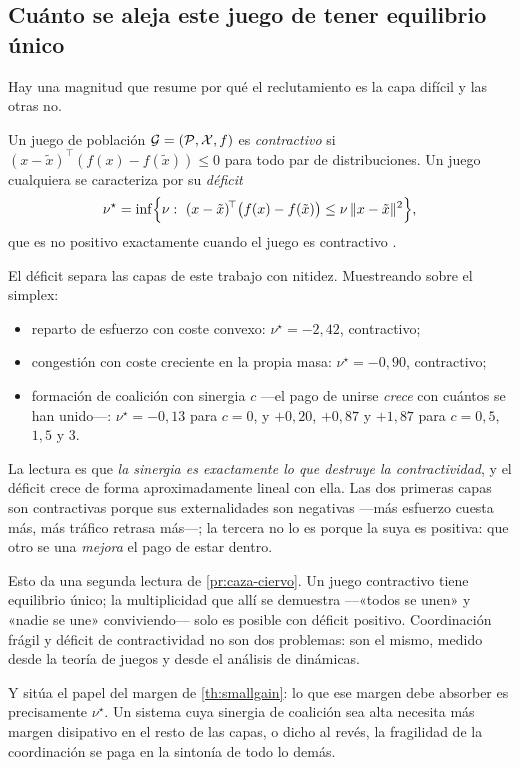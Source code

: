 \subsection{Cuánto se aleja este juego de tener equilibrio único}

Hay una magnitud que resume por qué el reclutamiento es la capa difícil y las
otras no.

\begin{definicion}
\label{def:deficit}
Un juego de población $\mathcal{G}=(\mathcal{P},\mathcal{X},f)$ es \emph{contractivo} si
$(x-\tilde x)^{\!\top}(f(x)-f(\tilde x))\le0$ para todo par de distribuciones. Un
juego cualquiera se caracteriza por su \emph{déficit}
\[
  \nu^\star=\inf\Bigl\{\nu:\ (x-\tilde x)^{\!\top}\bigl(f(x)-f(\tilde x)\bigr)
  \le\nu\,\lVert x-\tilde x\rVert^{2}\Bigr\},
\]
que es no positivo exactamente cuando el juego es contractivo
\cite{martinezPiazuelo2025gne}.
\end{definicion}

\begin{observacion}
\label{obs:deficit-capas}
El déficit separa las capas de este trabajo con nitidez. Muestreando sobre el
simplex:
\begin{itemize}[leftmargin=1.9em,topsep=0.2em,itemsep=0.15em]
  \item reparto de esfuerzo con coste convexo: $\nu^\star=-2{,}42$, contractivo;
  \item congestión con coste creciente en la propia masa: $\nu^\star=-0{,}90$,
  contractivo;
  \item formación de coalición con sinergia $c$ —el pago de unirse \emph{crece}
  con cuántos se han unido—: $\nu^\star=-0{,}13$ para $c=0$, y $+0{,}20$,
  $+0{,}87$ y $+1{,}87$ para $c=0{,}5$, $1{,}5$ y $3$.
\end{itemize}

La lectura es que \emph{la sinergia es exactamente lo que destruye la
contractividad}, y el déficit crece de forma aproximadamente lineal con ella. Las
dos primeras capas son contractivas porque sus externalidades son negativas —más
esfuerzo cuesta más, más tráfico retrasa más—; la tercera no lo es porque la suya
es positiva: que otro se una \emph{mejora} el pago de estar dentro.
\end{observacion}

\begin{observacion}
\label{obs:deficit-ciervo}
Esto da una segunda lectura de \cref{pr:caza-ciervo}. Un juego contractivo tiene
equilibrio único; la multiplicidad que allí se demuestra —«todos se unen» y
«nadie se une» conviviendo— solo es posible con déficit positivo. Coordinación
frágil y déficit de contractividad no son dos problemas: son el mismo, medido
desde la teoría de juegos y desde el análisis de dinámicas.

Y sitúa el papel del margen de \cref{th:smallgain}: lo que ese margen debe
absorber es precisamente $\nu^\star$. Un sistema cuya sinergia de coalición sea
alta necesita más margen disipativo en el resto de las capas, o dicho al revés,
la fragilidad de la coordinación se paga en la sintonía de todo lo demás.
\end{observacion}

